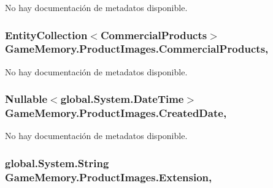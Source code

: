 No hay documentación de metadatos disponible. 

\hypertarget{class_game_memory_1_1_product_images_a24dde10ce929840666d5e7cfc9c2ecef}{
\subsubsection[{Commercial\-Products}]{\setlength{\rightskip}{0pt plus 5cm}Entity\-Collection$<${\bf Commercial\-Products}$>$ Game\-Memory.\-Product\-Images.\-Commercial\-Products\hspace{0.3cm}{\ttfamily [get]}, {\ttfamily [set]}}}\label{class_game_memory_1_1_product_images_a24dde10ce929840666d5e7cfc9c2ecef}


No hay documentación de metadatos disponible. 

\hypertarget{class_game_memory_1_1_product_images_a6e7dbbf06a198f98bdedd9d6a2f1522a}{
\subsubsection[{Created\-Date}]{\setlength{\rightskip}{0pt plus 5cm}Nullable$<$global.\-System.\-Date\-Time$>$ Game\-Memory.\-Product\-Images.\-Created\-Date\hspace{0.3cm}{\ttfamily [get]}, {\ttfamily [set]}}}\label{class_game_memory_1_1_product_images_a6e7dbbf06a198f98bdedd9d6a2f1522a}


No hay documentación de metadatos disponible. 

\hypertarget{class_game_memory_1_1_product_images_a3bb1f630d13a3acd2a74c75948ab7855}{
\subsubsection[{Extension}]{\setlength{\rightskip}{0pt plus 5cm}global.\-System.\-String Game\-Memory.\-Product\-Images.\-Extension\hspace{0.3cm}{\ttfamily [get]}, {\ttfamily [set]}}}\label{class_game_memory_1_1_product_images_a3bb1f630d13a3acd2a74c75948ab7855}


